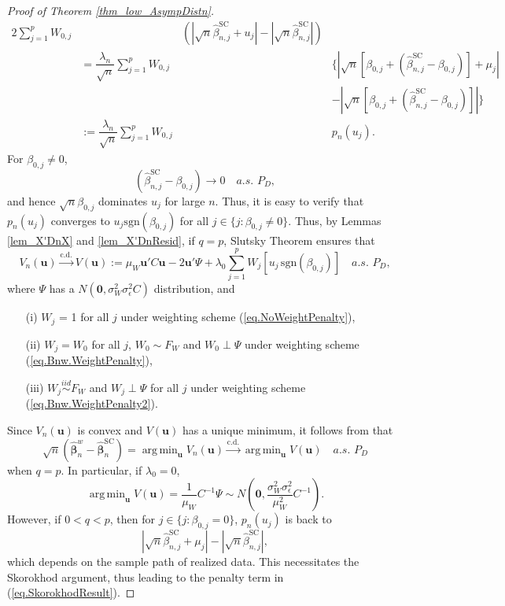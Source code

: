 \documentclass[ejs,authoryear,linksfromyear]{imsart}
\DeclareMathOperator*{\argmin}{arg\,min} %
\newcommand{\CONV}[1]{\stackrel{\text{#1}}{\longrightarrow}} %
\newcommand{\bnw}{\widehat{\bm{\beta}}_n^w} %
\newcommand{\bSC}{\widehat{\bm{\beta}}_n^{\text{SC}}} %
\numberwithin{equation}{section}
\theoremstyle{plain}
\begin{document}
\begin{proof}[Proof of Theorem \ref{thm_low_AsympDistn}]
\begin{alignat*}{2}
	\sum_{j=1}^p W_{0,j}
	&&\left(
		\left|
			\sqrt{n} \widehat{\beta}^{\text{SC}}_{n,j} + u_j
		\right|
		- \left|
			\sqrt{n} \widehat{\beta}^{\text{SC}}_{n,j}
		\right|
	\right) \\
	&= \dfrac{\lambda_n}{\sqrt{n}} \sum_{j=1}^p W_{0,j}
	&&\Big\{
		\left| \sqrt{n}
			\left[
				\beta_{0,j}
				+ \left(
					\widehat{\beta}_{n,j}^{\text{SC}} - \beta_{0,j} 
				\right)
			\right]  
			+ \mu_j
		\right| \\
	& &&- \left| \sqrt{n}
		\left[
			\beta_{0,j}
			+ \left(
				\widehat{\beta}_{n,j}^{\text{SC}} - \beta_{0,j} 
			\right)
		\right]  
	\right|
	\Big\} \\
	&:= \dfrac{\lambda_n}{\sqrt{n}}
	\sum_{j=1}^p W_{0,j} &&p_n(u_j).
	\end{alignat*}
	For $\beta_{0,j} \neq 0$,
	$$
	\left( \widehat{\beta}_{n,j}^{\text{SC}} - \beta_{0,j} \right) 
	\to  0 \quad a.s. \,\, P_D,
	$$
	and hence $\sqrt{n} \beta_{0,j}$ dominates $u_j$ for large $n$. Thus, it is easy to verify that $p_n(u_j)$ converges to $u_j \text{sgn} \left( \beta_{0,j} \right)$ for all $j \in \{j: \beta_{0,j} \neq 0 \}$. Thus, by Lemmas \ref{lem_X'DnX} and \ref{lem_X'DnResid}, if $q=p$, Slutsky Theorem ensures that
	$$
	V_n(\bm{u}) \CONV{c.d.} V(\bm{u})
	:= \mu_W \bm{u}' C \bm{u} - 2 \bm{u}' \Psi
	+ \lambda_0 \sum_{j=1}^p W_j
	\left[
		u_j \, \text{sgn}(\beta_{0,j}) 
	\right]
	\quad a.s. \,\, P_D, 
	$$
	where $\Psi$ has a $N \left( \bm{0}, \sigma^2_W \sigma^2_{\epsilon} C \right)$ distribution, and
	\begin{itemize}
		\item [(i)] $W_j$ = 1 for all $j$ under weighting scheme (\ref{eq.NoWeightPenalty}),
		\item [(ii)] $W_j = W_0$ for all $j$, $W_0 \sim F_W$ and $W_0 \perp \Psi$ under weighting scheme (\ref{eq.Bnw.WeightPenalty}), 
		\item [(iii)] $W_j \stackrel{iid}{\sim} F_W$ and $W_j \perp \Psi$ for all $j$ under weighting scheme (\ref{eq.Bnw.WeightPenalty2}).
	\end{itemize}
	Since $V_n(\bm{u})$ is convex and $V(\bm{u})$ has a unique minimum, it follows from \citet{Geyer1996} that
	$$
	\sqrt{n} \left( \bnw - \bSC \right) 
	= \argmin_{ \bm{u} } V_n( \bm{u} ) 
	\CONV{c.d.}
	\argmin_{ \bm{u} } V( \bm{u} ) \quad a.s. \,\, P_D
	$$
	when $q = p$. In particular, if $\lambda_0 = 0$, 
	$$
	\argmin_{ \bm{u} } V( \bm{u} )
	= \dfrac{1}{\mu_W} C^{-1} \Psi \sim N 
	\left( \bm{0}, \dfrac{ \sigma^2_W \sigma^2_{\epsilon} }{\mu_W^2} C^{-1} \right) . 
	$$
	However, if $0 < q < p$, then for $j \in \{j: \beta_{0,j} = 0 \}$, $p_n(u_j)$ is back to   
	$$
	\left| 
	\sqrt{n} \widehat{\beta}_{n,j}^{\text{SC}} 
	+ \mu_j
	\right|
	- \left|
	\sqrt{n} \widehat{\beta}_{n,j}^{\text{SC}}
	\right|,
	$$ 
	which depends on the sample path of realized data. This necessitates the Skorokhod argument, thus leading to the penalty term in (\ref{eq.SkorokhodResult}). 
\end{proof}
\end{document}
